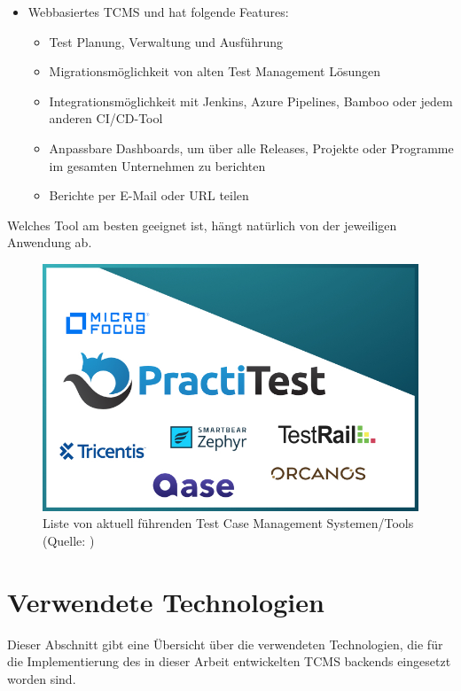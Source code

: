 \documentclass[a4paper, fontsize=11pt, parskip=half, twoside]{scrreprt}
\begin{document}
\begin{itemize}
		\item \textcite{noauthor_tricentis_nodate-1} 
		
		Webbasiertes \ac{TCMS} und hat folgende Features:
		
		\begin{itemize}
			\setlength\itemsep{-0.5em}
			\item Test Planung, Verwaltung und Ausführung 
			\item Migrationsmöglichkeit von alten Test Management Lösungen
			\item Integrationsmöglichkeit mit Jenkins, Azure Pipelines, Bamboo oder jedem anderen CI/CD-Tool
			\item Anpassbare Dashboards, um über alle Releases, Projekte oder Programme im gesamten Unternehmen zu berichten
			\item Berichte per E-Mail oder URL teilen
		\end{itemize}
	\end{itemize}
	
	Welches Tool am besten geeignet ist, hängt natürlich von der jeweiligen Anwendung ab.
	\newline
	\begin{figure}[H]
		\centering
		\includegraphics[scale=0.5]{assets/best-tool-logos.jpg}
		\caption{Liste von aktuell führenden Test Case Management Systemen/Tools (Quelle: \textcite{noauthor_7_nodate})}
		\label{fig:tcms_logo}
	\end{figure}
	 
	
	\section{Verwendete Technologien}
	Dieser Abschnitt gibt eine Übersicht über die verwendeten Technologien, die für die Implementierung des in dieser Arbeit entwickelten \ac{TCMS} backends eingesetzt worden sind.
	
\end{document}
